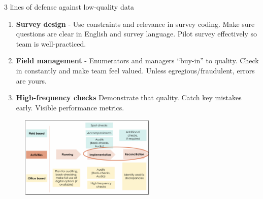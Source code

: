 \documentclass[aspectratio=169]{beamer}
\begin{document}
\begin{frame}[fragile]{3 lines of defense against low-quality data}
\begin{multicols}{2}	
	
	\begin{enumerate}
		\item<1> \textbf{Survey design}
				\newline - Use constraints and relevance in survey coding. Make sure questions are clear in English and survey language. Pilot survey effectively so team is well-practiced.
		\item<1> \textbf{Field management}
					\newline - Enumerators and managers “buy-in” to quality. Check in constantly and make team feel valued. Unless egregious/fraudulent, errors are yours. 
		\item<1> \textbf{High-frequency checks}
					\newline Demonstrate that quality. Catch key mistakes early. Visible performance metrics.
	\end{enumerate}
	
	\begin{figure}
		\centering
		\includegraphics[width=65mm, right]{img/Quality2}
	\end{figure}
	
\end{multicols}
\end{frame}
\end{document}
